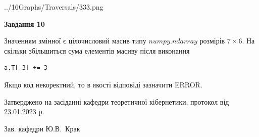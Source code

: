 \documentclass[12pt, ukrainian]{article}
\begin{document}
{\begin {large}
\begin{center}
	{../16Graphs/Traversals/333.png}
\end{center}\par
\newpage

{\begin {center}\textbf{Завдання 10}\end {center}}\par
Значенням змінної  є цілочисловий масив типу $numpy.ndarray$ розмірів $7{\times}6$. На скільки збільшиться сума елементів масиву  після виконання
\begin{verbatim}
a.T[-3] += 3
\end{verbatim}


Якщо код некоректний, то в якості відповіді зазначити ERROR.\par
\newpage


\end {large}
}
{\smallskip \begin {small} Затверджено на засіданні кафедри теоретичної кібернетики, протокол  від   23.01.2023 р.\par\smallskip\smallskip
{\parbox {6.5 cm}{Зав. кафедри \dotfill Ю.В.~Крак}} \end{small}}
\end{document}
